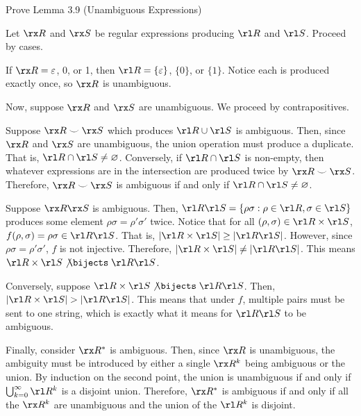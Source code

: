 \documentclass[class=math239,notes]{agony}
\begin{document}
\begin{xca}
  Prove Lemma 3.9 (Unambiguous Expressions)
\end{xca}
\begin{prf}
  Let $\rx R$ and $\rx S$ be regular expressions producing $\rl R$ and $\rl S$.
  Proceed by cases.

  If $\rx R = \varepsilon$, 0, or 1, then $\rl R = \{\varepsilon\}$, $\{0\}$, or $\{1\}$.
  Notice each is produced exactly once, so $\rx R$ is unambiguous.

  Now, suppose $\rx R$ and $\rx S$ are unambiguous.
  We proceed by contrapositives.

  Suppose $\rx R \smile \rx S$ which produces $\rl R \cup \rl S$ is ambiguous.
  Then, since $\rx R$ and $\rx S$ are unambiguous,
  the union operation must produce a duplicate.
  That is, $\rl R \cap \rl S \neq \varnothing$.
  Conversely, if $\rl R \cap \rl S$ is non-empty,
  then whatever expressions are in the intersection are produced twice by $\rx R \smile \rx S$.
  Therefore, $\rx R \smile \rx S$ is ambiguous if and only if $\rl R \cap \rl S \neq \varnothing$.

  Suppose $\rx R\rx S$ is ambiguous.
  Then, $\rl R \rl S = \{\rho\sigma : \rho \in \rl R, \sigma \in \rl S\}$
  produces some element $\rho\sigma = \rho'\sigma'$ twice.
  Notice that for all $(\rho,\sigma) \in \rl R \times \rl S$, $f(\rho,\sigma) = \rho\sigma \in \rl R \rl S$.
  That is, $\abs{\rl R \times \rl S} \geq \abs{\rl R \rl S}$.
  However, since $\rho\sigma = \rho'\sigma'$, $f$ is not injective.
  Therefore, $\abs{\rl R \times \rl S} \neq \abs{\rl R \rl S}$.
  This means $\rl R\times\rl S \mathrel{\not\bijects} \rl R\rl S$.

  Conversely, suppose $\rl R\times\rl S \mathrel{\not\bijects} \rl R\rl S$.
  Then, $\abs{\rl R \times \rl S} > \abs{\rl R \rl S}$.
  This means that under $f$, multiple pairs must be sent to one string,
  which is exactly what it means for $\rl R\rl S$ to be ambiguous.

  Finally, consider $\rx R^*$ is ambiguous.
  Then, since $\rx R$ is unambiguous, the ambiguity must be introduced
  by either a single $\rx R^k$ being ambiguous or the union.
  By induction on the second point, the union is unambiguous if and only if
  $\bigcup_{k=0}^\infty \rl R^k$ is a disjoint union.
  Therefore, $\rx R^*$ is ambiguous if and only if all the $\rx R^k$ are unambiguous
  and the union of the $\rl R^k$ is disjoint.
\end{prf}
\end{document}

